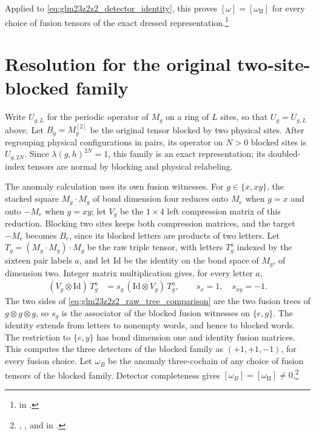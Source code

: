 \documentclass{article}
\begin{document}
Applied to \eqref{eq:glm23z2z2_detector_identity}, this proves
$[\omega]=[\omega_{\mathrm{II}}]$ for every choice of fusion tensors of the
exact dressed representation.\footnote{
     in
    .}

\section{Resolution for the original two-site-blocked family}

Write $U_{g,L}$ for the periodic operator of $M_g$ on a ring of $L$ sites,
so that $U_g=U_{g,L}$ above. Let $B_g=M_g^{[2]}$ be the original tensor
blocked by two physical sites. After regrouping physical configurations in
pairs, its operator on $N>0$ blocked sites is $U_{g,2N}$. Since
$\lambda(g,h)^{2N}=1$, this family is an exact representation; its
doubled-index tensors are normal by blocking and physical relabeling.

The anomaly calculation uses its own fusion witnesses. For $g\in\{x,xy\}$,
the stacked square $M_g\cdot M_g$ of bond dimension four reduces onto $M_e$
when $g=x$ and onto $-M_e$ when $g=xy$; let $V_g$ be the $1\times4$ left
compression matrix of this reduction. Blocking two sites keeps both
compression matrices, and the target $-M_e$ becomes $B_e$, since its
blocked letters are products of two letters. Let
$T_g=(M_g\cdot M_g)\cdot M_g$ be the raw triple tensor, with letters $T_g^a$
indexed by the sixteen pair labels $a$, and let $\mathrm{Id}$ be the
identity on the bond space of $M_g$, of dimension two. Integer matrix
multiplication gives, for every letter $a$,
\begin{align}
    (V_g\otimes\mathrm{Id})\,T_g^a
     & =s_g\,(\mathrm{Id}\otimes V_g)\,T_g^a,
    \qquad s_x=1,\quad s_{xy}=-1.
    \label{eq:glm23z2z2_raw_tree_comparison}
\end{align}
The two sides of \eqref{eq:glm23z2z2_raw_tree_comparison} are the two
fusion trees of $g\otimes g\otimes g$, so $s_g$ is the associator of the
blocked fusion witnesses on $\{e,g\}$. The identity extends from letters to
nonempty words, and hence to blocked words. The restriction to $\{e,y\}$
has bond dimension one and identity fusion matrices. This computes the
three detectors of the blocked family as $(+1,+1,-1)$, for every
fusion choice. Let $\omega_B$ be the anomaly three-cochain of any choice of
fusion tensors of the blocked family. Detector completeness gives
$[\omega_B]=[\omega_{\mathrm{II}}]\neq0$.\footnote{
    ,
    ,
    and  in
    .}
\end{document}
